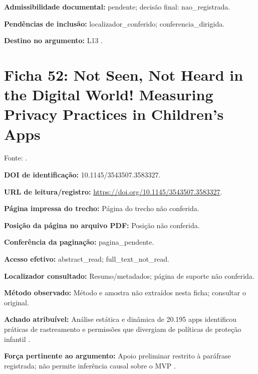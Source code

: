\noindent\textbf{Admissibilidade documental:} pendente; decisão final: nao\_registrada.\par\medskip

\noindent\textbf{Pendências de inclusão:} localizador\_conferido; conferencia\_dirigida.\par\medskip

\noindent\textbf{Destino no argumento:} L13 .

\clearpage\section*{Ficha 52: Not Seen, Not Heard in the Digital World! Measuring Privacy Practices in Children’s Apps}

Fonte: \citet{OS17}.

\noindent\textbf{DOI de identificação:} 10.1145/3543507.3583327.\par\medskip

\noindent\textbf{URL de leitura/registro:} \url{https://doi.org/10.1145/3543507.3583327}.\par\medskip

\noindent\textbf{Página impressa do trecho:} Página do trecho não conferida.\par\medskip

\noindent\textbf{Posição da página no arquivo PDF:} Posição não conferida.\par\medskip

\noindent\textbf{Conferência da paginação:} pagina\_pendente.\par\medskip

\noindent\textbf{Acesso efetivo:} abstract\_read; full\_text\_not\_read.\par\medskip

\noindent\textbf{Localizador consultado:} Resumo/metadados; página de suporte não conferida.\par\medskip

\noindent\textbf{Método observado:} Método e amostra não extraídos nesta ficha; consultar o original.\par\medskip

\noindent\textbf{Achado atribuível:} Análise estática e dinâmica de 20.195 apps identificou práticas de rastreamento e permissões que divergiam de políticas de proteção infantil \citep{OS17}.\par\medskip

\noindent\textbf{Força pertinente ao argumento:} Apoio preliminar restrito à paráfrase registrada; não permite inferência causal sobre o MVP \citep{OS17}.\par\medskip

